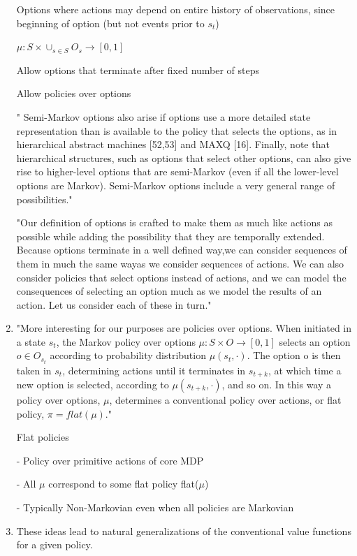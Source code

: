 \documentclass[english]{article}
\begin{document}
\begin{enumerate}
Options where actions may depend on entire
history of observations, since beginning of option (but not events prior to $s_t$)

$\mu:S\times \cup_{s\in S} O_s \to [0,1]$



Allow options that terminate after fixed number of steps

Allow policies over options

" Semi-Markov
options also arise if options use a more detailed state representation than is available
to the policy that selects the options, as in hierarchical abstract machines [52,53] and
MAXQ [16]. Finally, note that hierarchical structures, such as options that select other
options, can also give rise to higher-level options that are semi-Markov (even if all the
lower-level options are Markov). Semi-Markov options include a very general range of
possibilities."


"Our definition of options is crafted to make them as much like actions as possible while
adding the possibility that they are temporally extended. Because options terminate in a
well defined way,we can consider sequences of them in much the same wayas we consider
sequences of actions. We can also consider policies that select options instead of actions,
and we can model the consequences of selecting an option much as we model the results
of an action. Let us consider each of these in turn."

\item 
"More interesting for our purposes are policies over options. When initiated in a state $s_t$,
the Markov policy over options $\mu:S \times O \to [0,1]$ selects an option $o \in O_{s_t}$ according to
probability distribution $\mu(s_t ,\cdot)$. The option o is then taken in $s_t$, determining actions until
it terminates in $s_{t+k}$, at which time a new option is selected, according to $\mu(s_{t+k} ,\cdot)$, and
so on. In this way a policy over options, $\mu$, determines a conventional policy over actions,
or flat policy, $\pi = flat(\mu)$."

Flat policies

- Policy over primitive actions of core MDP

- All $\mu$ correspond to some flat policy flat($\mu$)

- Typically Non-Markovian even when all policies are Markovian

\item These ideas lead to natural generalizations of the conventional value functions for a
given policy.


\end{enumerate}
\end{document}
